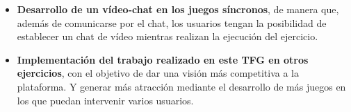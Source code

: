 \documentclass[a4paper, 12pt]{book}
\begin{document}
\begin{itemize}
\item \textbf{Desarrollo de un vídeo-chat en los juegos síncronos}, de manera que, además de comunicarse por el chat, los usuarios tengan la posibilidad de establecer un chat de vídeo mientras realizan la ejecución del ejercicio.

\item \textbf{Implementación del trabajo realizado en este TFG en otros ejercicios}, con el objetivo de dar una visión más competitiva a la plataforma. Y generar más atracción mediante el desarrollo de más juegos en los que puedan intervenir varios usuarios.
\end{itemize}







\end{document}

